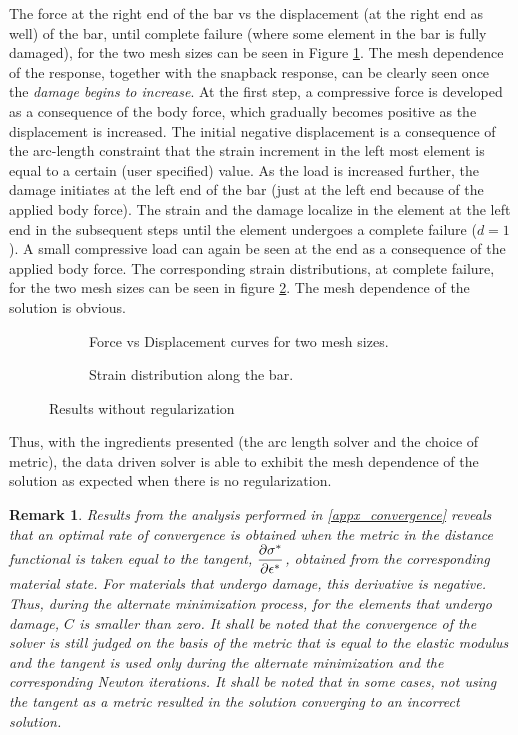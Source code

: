 \documentclass[11pt]{elsarticle}
\newtheorem*{remark}{Remark}
\begin{document}
The force at the right end of the bar vs the displacement (at the right end as well) of the bar, until complete failure (where some element in the bar is fully damaged), for the two mesh sizes can be seen in Figure \ref{force_disp_local}. The mesh dependence of the response, together with the snapback response, can be clearly seen once the \textit{damage begins to increase}. At the first step, a compressive force is developed as a consequence of the body force, which gradually becomes positive as the displacement is increased. The initial negative displacement is a consequence of the arc-length constraint that the strain increment in the left most element is equal to a certain (user specified) value. As the load is increased further, the damage initiates at the left end of the bar (just at the left end because of the applied body force). The strain and the damage localize in the element at the left end in the subsequent steps until the element undergoes a complete failure ($d=1$). A small compressive load can again be seen at the end as a consequence of the applied body force. The corresponding strain distributions, at complete failure, for the two mesh sizes can be seen in figure \ref{strain_dist_local}. The mesh dependence of the solution is obvious.

\begin{figure}[ht]
	\begin{subfigure}{0.45\textwidth}
		\centering
		
		\caption{Force vs Displacement curves for two mesh sizes.}
		\label{force_disp_local}
	\end{subfigure}
	\hfill
	\begin{subfigure}{0.45\textwidth}
		\centering
		
		\caption{Strain distribution along the bar.}
		\label{strain_dist_local}
	\end{subfigure}
	\caption{Results without regularization}
	\label{fig:Results_without_regularization}
\end{figure}



Thus, with the ingredients presented (the arc length solver and the choice of metric), the data driven solver is able to exhibit the mesh dependence of the solution as expected when there is no regularization.

\begin{remark}
	Results from the analysis performed in \ref{appx_convergence} reveals that an optimal rate of convergence is obtained when the metric in the distance functional is taken equal to the tangent, ${\dfrac{\partial \sigma^*}{\partial \epsilon^*}}$, obtained from the corresponding material state. For materials that undergo damage, this derivative is negative. Thus, during the alternate minimization process, for the elements that undergo damage, $C$ is smaller than zero. It shall be noted that the convergence of the solver is still judged on the basis of the metric that is equal to the elastic modulus and the tangent is used only during the alternate minimization and the corresponding Newton iterations. It shall be noted that in some cases, not using the tangent as a metric resulted in the solution converging to an \textit{incorrect} solution.
\end{remark}
\end{document}
